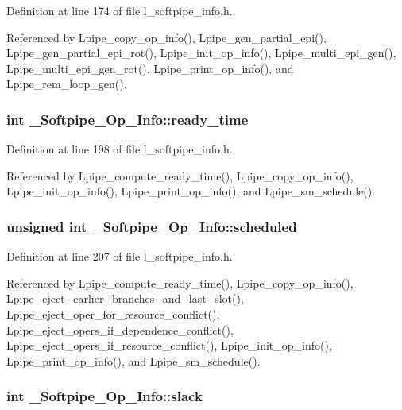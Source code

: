 Definition at line 174 of file l\_\-softpipe\_\-info.h.

Referenced by Lpipe\_\-copy\_\-op\_\-info(), Lpipe\_\-gen\_\-partial\_\-epi(), Lpipe\_\-gen\_\-partial\_\-epi\_\-rot(), Lpipe\_\-init\_\-op\_\-info(), Lpipe\_\-multi\_\-epi\_\-gen(), Lpipe\_\-multi\_\-epi\_\-gen\_\-rot(), Lpipe\_\-print\_\-op\_\-info(), and Lpipe\_\-rem\_\-loop\_\-gen().
\subsubsection{\setlength{\rightskip}{0pt plus 5cm}int \bf{\_\-Softpipe\_\-Op\_\-Info::ready\_\-time}}\label{struct__Softpipe__Op__Info_245284eb1dba24400c1d117c8cbed493}




Definition at line 198 of file l\_\-softpipe\_\-info.h.

Referenced by Lpipe\_\-compute\_\-ready\_\-time(), Lpipe\_\-copy\_\-op\_\-info(), Lpipe\_\-init\_\-op\_\-info(), Lpipe\_\-print\_\-op\_\-info(), and Lpipe\_\-sm\_\-schedule().
\subsubsection{\setlength{\rightskip}{0pt plus 5cm}unsigned int \bf{\_\-Softpipe\_\-Op\_\-Info::scheduled}}\label{struct__Softpipe__Op__Info_36a815a8c5d408f4e7c86d0c5df13ab4}




Definition at line 207 of file l\_\-softpipe\_\-info.h.

Referenced by Lpipe\_\-compute\_\-ready\_\-time(), Lpipe\_\-copy\_\-op\_\-info(), Lpipe\_\-eject\_\-earlier\_\-branches\_\-and\_\-last\_\-slot(), Lpipe\_\-eject\_\-oper\_\-for\_\-resource\_\-conflict(), Lpipe\_\-eject\_\-opers\_\-if\_\-dependence\_\-conflict(), Lpipe\_\-eject\_\-opers\_\-if\_\-resource\_\-conflict(), Lpipe\_\-init\_\-op\_\-info(), Lpipe\_\-print\_\-op\_\-info(), and Lpipe\_\-sm\_\-schedule().
\subsubsection{\setlength{\rightskip}{0pt plus 5cm}int \bf{\_\-Softpipe\_\-Op\_\-Info::slack}}\label{struct__Softpipe__Op__Info_ffee04f42974a52a0a393131c24e56f3}




